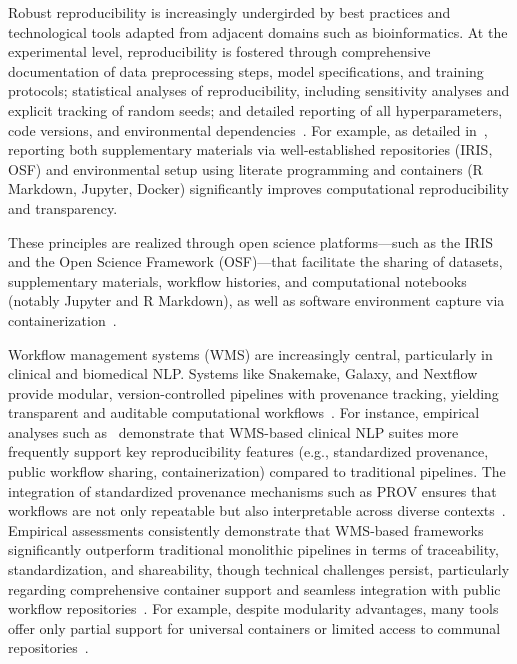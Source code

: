 \documentclass[sigconf]{acmart}
\begin{document}
Robust reproducibility is increasingly undergirded by best practices and technological tools adapted from adjacent domains such as bioinformatics. At the experimental level, reproducibility is fostered through comprehensive documentation of data preprocessing steps, model specifications, and training protocols; statistical analyses of reproducibility, including sensitivity analyses and explicit tracking of random seeds; and detailed reporting of all hyperparameters, code versions, and environmental dependencies~\cite{ref108}. For example, as detailed in~\cite{ref108}, reporting both supplementary materials via well-established repositories (IRIS, OSF) and environmental setup using literate programming and containers (R Markdown, Jupyter, Docker) significantly improves computational reproducibility and transparency.

These principles are realized through open science platforms---such as the IRIS and the Open Science Framework (OSF)---that facilitate the sharing of datasets, supplementary materials, workflow histories, and computational notebooks (notably Jupyter and R Markdown), as well as software environment capture via containerization~\cite{ref108}.

Workflow management systems (WMS) are increasingly central, particularly in clinical and biomedical NLP. Systems like Snakemake, Galaxy, and Nextflow provide modular, version-controlled pipelines with provenance tracking, yielding transparent and auditable computational workflows~\cite{ref12,ref13,ref24,ref25,ref28,ref29,ref32,ref33,ref34,ref39,ref44,ref46,ref50,ref58,ref65}. For instance, empirical analyses such as~\cite{ref28} demonstrate that WMS-based clinical NLP suites more frequently support key reproducibility features (e.g., standardized provenance, public workflow sharing, containerization) compared to traditional pipelines. The integration of standardized provenance mechanisms such as PROV ensures that workflows are not only repeatable but also interpretable across diverse contexts~\cite{ref28,ref13}. Empirical assessments consistently demonstrate that WMS-based frameworks significantly outperform traditional monolithic pipelines in terms of traceability, standardization, and shareability, though technical challenges persist, particularly regarding comprehensive container support and seamless integration with public workflow repositories~\cite{ref65}. For example, despite modularity advantages, many tools offer only partial support for universal containers or limited access to communal repositories~\cite{ref28,ref65}.
\end{document}

